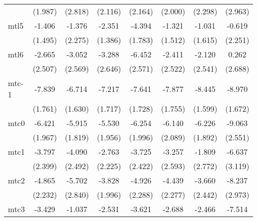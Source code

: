 \documentclass{article}
\begin{document}
{\begin{longtable}{l*{7}{c}}
                &  (1.987)         &  (2.818)         &  (2.116)         &  (2.164)         &  (2.000)         &  (2.298)         &  (2.963)         \\
mtl5            &   -1.406         &   -1.376         &   -2.351         &   -4.394\sym{*}  &   -1.321         &   -1.031         &   -0.619         \\
                &  (1.495)         &  (2.275)         &  (1.386)         &  (1.783)         &  (1.512)         &  (1.615)         &  (2.251)         \\
mtl6            &   -2.665         &   -3.052         &   -3.288         &   -6.452\sym{*}  &   -2.411         &   -2.120         &    0.262         \\
                &  (2.507)         &  (2.569)         &  (2.646)         &  (2.571)         &  (2.522)         &  (2.541)         &  (2.688)         \\
mtc-1           &   -7.839\sym{***}&   -6.714\sym{***}&   -7.217\sym{***}&   -7.641\sym{***}&   -7.877\sym{***}&   -8.445\sym{***}&   -8.970\sym{***}\\
                &  (1.761)         &  (1.630)         &  (1.717)         &  (1.728)         &  (1.755)         &  (1.599)         &  (1.672)         \\
mtc0            &   -6.421\sym{**} &   -5.915\sym{**} &   -5.530\sym{**} &   -6.254\sym{**} &   -6.140\sym{**} &   -6.226\sym{**} &   -9.063\sym{**} \\
                &  (1.967)         &  (1.819)         &  (1.956)         &  (1.996)         &  (2.089)         &  (1.892)         &  (2.551)         \\
mtc1            &   -3.797         &   -4.090         &   -2.763         &   -3.725         &   -3.257         &   -1.809         &   -6.637\sym{*}  \\
                &  (2.399)         &  (2.492)         &  (2.225)         &  (2.422)         &  (2.593)         &  (2.772)         &  (3.119)         \\
mtc2            &   -4.865\sym{*}  &   -5.702         &   -3.828         &   -4.926\sym{*}  &   -4.439         &   -3.660         &   -8.237\sym{**} \\
                &  (2.232)         &  (2.840)         &  (1.996)         &  (2.288)         &  (2.277)         &  (2.442)         &  (2.973)         \\
mtc3            &   -3.429         &   -1.037         &   -2.531         &   -3.621         &   -2.688         &   -2.466         &   -7.514\sym{**} \\

\end{longtable}}
\end{document}
